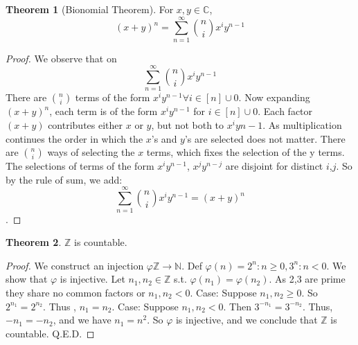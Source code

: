 \documentclass{article}
\theoremstyle{definition}
\newtheorem{theorem}{Theorem}[section]
\begin{document}
\begin{theorem}[Bionomial Theorem]
For $x,y \in \mathbb{C}$, $$(x+y)^n = {\sum_{n=1}^{\infty}}{{n}\choose{i}}x^{i}y^{n-1}$$\end{theorem}
\begin{proof}
We observe that on $${\sum_{n=1}^{\infty}}{{n}\choose{i}}x^{i}y^{n-1}$$ There are ${n}\choose{i}$
terms of the form $x^{i}y^{n-1} \forall i \in [n]\cup {0}$. Now expanding $(x+y)^n$, each term is of the form $x^{i}y^{n-1}$ for $i \in [n]\cup {0}$. Each factor $(x+y)$ contributes either $x$ or $y$, but not both to $x^{i}y{n-1}$. As multiplication continues the order in which the $x$'s and $y$'s are selected does not matter. There are ${n}\choose{i}$ ways of selecting the $x$ terms, which fixes the selection of the y terms. The selections of terms of the form $x^{i}y^{n-1}$, $x^{j}y^{n-j}$ are disjoint for distinct $i$,$j$. So by the rule of sum, we add: $${\sum_{n=1}^{\infty}}{{n}\choose{i}}x^{i}y^{n-1} = (x+y)^n$$.
\end{proof}

\begin{theorem}
$\mathbb{Z}$ is countable.
\end{theorem}
\begin{proof}
We construct an injection $\varphi \mathbb{Z} \rightarrow \mathbb{N}$.  Def $\varphi (n) = {2^n: n \geq 0, 3^n: n<0 }$. We show that $\varphi$ is injective. Let $n_1, n_2 \in \mathbb{Z}$ s.t. $\varphi (n_1) = \varphi(n_2)$. As 2,3 are prime they share no common factors or $n_1, n_2 <0$. Case: Suppose $n_1, n_2 \geq 0$. So $2^{n_1}=2^{n_2}$. Thus , $n_1 = n_2$. Case: Suppose $n_1, n_2 <0$. Then $3^{-n_1}=3^{-n_2}$. Thus, $-n_1 = -n_2$, and we have $n_1=n^2$. So $\varphi$ is injective, and we conclude that $\mathbb{Z}$ is countable. Q.E.D.
\end{proof}
\end{document}
